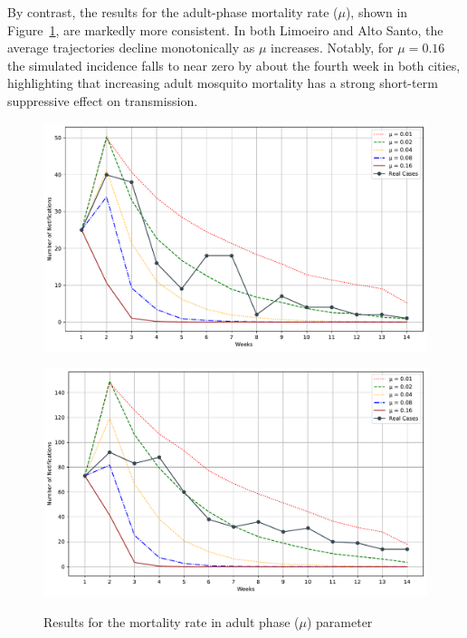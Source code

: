 By contrast, the results for the adult-phase mortality rate ($\mu$), shown in Figure~\ref{fig:sensitivity-analysis-mu}, are markedly more consistent. In both Limoeiro and Alto Santo, the average trajectories decline monotonically as $\mu$ increases. Notably, for $\mu=0.16$ the simulated incidence falls to near zero by about the fourth week in both cities, highlighting that increasing adult mosquito mortality has a strong short-term suppressive effect on transmission. 


\begin{figure}[h!]
    \begin{minipage}[c]{.45\textwidth}
      \centering
      \includegraphics[scale=0.3]{images/parameters-experiments/AS_2017-01-15_mosquitoes_death_rate.pdf} \\
    \end{minipage}
    \hspace{0.5cm}
    \begin{minipage}[c]{.45\textwidth}
        \centering
        \includegraphics[scale=0.3]{images/parameters-experiments/LN_2020-07-19_mosquitoes_death_rate.pdf} \\
    \end{minipage}
    \caption{\label{fig:sensitivity-analysis-mu}Results for the mortality rate in adult phase ($\mu$) parameter}
\end{figure}


